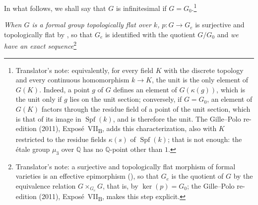 In what follows, we shall say that \(G\) is infinitesimal if
\(G=G_0\).\footnote{Translator's note: equivalently, for every field \(K\) with the discrete
topology and every continuous homomorphism \(k\to K\), the unit is the only element of \(G(K)\). Indeed,
a point \(g\) of \(G\) defines an element of \(G(\kappa(g))\), which is the unit only if \(g\) lies on the unit
section; conversely, if \(G=G_0\), an element of \(G(K)\) factors through the residue field of a point of
the unit section, which is that of its image in \(\operatorname{Spf}(k)\), and is therefore the unit. The
Gille--Polo re-edition (2011), Expos\'e~VII\textsubscript{B}, adds this characterization, also with \(K\)
restricted to the residue fields \(\kappa(s)\) of \(\operatorname{Spf}(k)\); that is not enough: the étale
group \(\mu_3\) over \(\mathbb Q\) has no \(\mathbb Q\)-point other than \(1\).}

\noindent
{}
\label{sga3:VIIB:2.5.1:corollary}%
\emph{When \(G\) is a formal group topologically flat over \(k\),}
\(p:G\to G_e\) is surjective and topologically flat by
, so that \(G_e\) is identified with the quotient
\(G/G_0\) and \emph{we have an exact sequence}\footnote{Translator's note: a surjective and
topologically flat morphism of formal varieties is an effective epimorphism (),
so that \(G_e\) is the quotient of \(G\) by the equivalence relation \(G\times_{G_e}G\), that is, by
\(\ker(p)=G_0\); the Gille--Polo re-edition (2011), Expos\'e~VII\textsubscript{B}, makes this step
explicit.}
\begin{center}
  \label{sga3:VIIB:2.5.1:short-exact-sequence}
  
\end{center}
